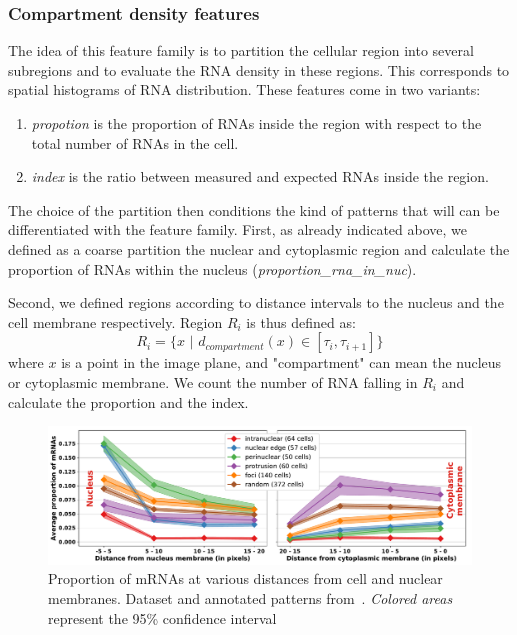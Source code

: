 \subsubsection{Compartment density features}


The idea of this feature family is to partition the cellular region into several subregions and to evaluate the \ac{RNA} density in these regions. This corresponds to spatial histograms of \ac{RNA} distribution. These features come in two variants: 
\begin{enumerate}
\item \emph{propotion} is the proportion of RNAs inside the region with respect to the total number of RNAs in the cell. 
\item \emph{index} is the ratio between measured and expected RNAs inside the region.
\end{enumerate}

The choice of the partition then conditions the kind of patterns that will can be differentiated with the feature family. First, as already indicated above, we defined as a coarse partition the nuclear and cytoplasmic region and calculate the proportion of \ac{RNA}s within the nucleus (\emph{proportion\_rna\_in\_nuc}). 

Second, we defined regions according to distance intervals to the nucleus and the cell membrane respectively. 
Region $R_i$ is thus defined as:
\begin{equation}
    R_i = \{ x \, \, | \, \, d_{compartment}(x) \in  [\tau_i, \tau_{i+1}] \}
\end{equation}where $x$ is a point in the image plane, and "compartment" can mean the nucleus or cytoplasmic membrane. 
We count the number of \ac{RNA} falling in $R_i$ and calculate the proportion and the index. 

\begin{figure}[htb]
    \centering
    \includegraphics[width=\textwidth]{figures/chapter4/plot_topography}
    \caption[Proportion of mRNAs in several subcellular regions]{Proportion of mRNAs at various distances from cell and nuclear membranes.
    Dataset and annotated patterns from~\cite{CHOUAIB_2020}.
    \textit{Colored areas} represent the 95\% confidence interval}
    \label{fig:features_topography}
\end{figure}

